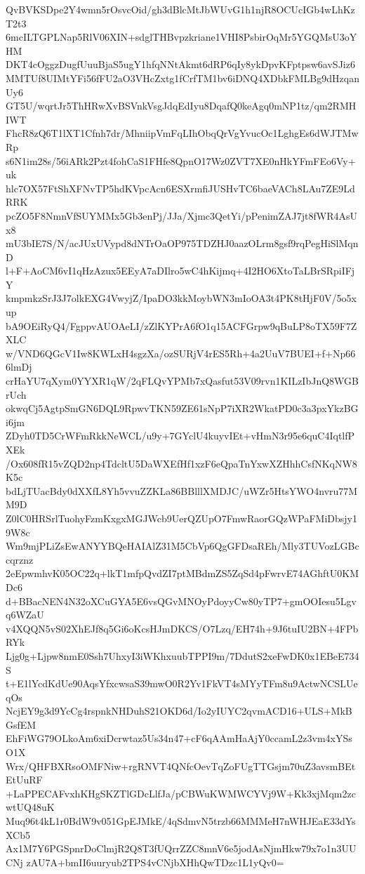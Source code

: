 QvBVKSDpe2Y4wmn5rOsvcOid/gh3dBlcMtJbWUvG1h1njR8OCUcIGb4wLhKzT2t3
6mcILTGPLNap5RlV06XIN+sdglTHBvpzkriane1VHI8PsbirOqMr5YGQMsU3oYHM
DKT4cOggzDugfUuuBjaS5ugY1hfqNNtAkmt6dRP6qIy8ykDpvKFptpsw6avSJiz6
MMTUf8UIMtYFi56fFU2aO3VHcZxtg1fCrfTM1bv6iDNQ4XDbkFMLBg9dHzqanUy6
GT5U/wqrtJr5ThHRwXvBSVnkVsgJdqEdIyu8DqafQ0keAgq0mNP1tz/qm2RMHIWT
FhcR8zQ6T1lXT1Cfnh7dr/MhniipVmFqLIhObqQrVgYvucOc1LghgEs6dWJTMwRp
s6N1im28s/56iARk2Pzt4fohCaS1FHfe8QpnO17Wz0ZVT7XE0nHkYFmFEo6Vy+uk
hlc7OX57FtShXFNvTP5hdKVpcAcn6ESXrmfiJUSHvTC6baeVACh8LAu7ZE9LdRRK
pcZO5F8NmnVfSUYMMx5Gb3enPj/JJa/Xjmc3QetYi/pPenimZAJ7jt8fWR4AsUx8
mU3bIE7S/N/acJUxUVypd8dNTrOaOP975TDZHJ0aazOLrm8gsf9rqPegHiSlMqnD
l+F+AoCM6vI1qHzAzux5EEyA7aDIlro5wC4hKijmq+4I2HO6XtoTaLBrSRpiIFjY
kmpmkzSrJ3J7olkEXG4VwyjZ/IpaDO3kkMoybWN3mIoOA3t4PK8tHjF0V/5o5xup
bA9OEiRyQ4/FgppvAUOAeLI/zZlKYPrA6fO1q15ACFGrpw9qBuLP8oTX59F7ZXLC
w/VND6QGcV1Iw8KWLxH4sgzXa/ozSURjV4rES5Rh+4a2UuV7BUEI+f+Np666lmDj
crHaYU7qXym0YYXR1qW/2qFLQvYPMb7xQasfut53V09rvn1KILzIbJnQ8WGBrUch
okwqCj5AgtpSmGN6DQL9RpwvTKN59ZE61sNpP7iXR2WkatPD0c3a3pxYkzBGi6jm
ZDyh0TD5CrWFmRkkNeWCL/u9y+7GYclU4kuyvIEt+vHmN3r95e6quC4IqtlfPXEk
/Ox608fR15vZQD2np4TdcltU5DaWXEfHf1xzF6eQpaTnYxwXZHhhCsfNKqNW8K5c
bdLjTUacBdy0dXXfL8Yh5vvuZZKLa86BBlllXMDJC/uWZr5HtsYWO4nvru77MM9D
Z0lC0HRSrlTuohyFzmKxgxMGJWcb9UerQZUpO7FmwRaorGQzWPaFMiDbsjy19W8c
Wm9mjPLiZsEwANYYBQeHAIAlZ31M5CbVp6QgGFDsaREh/Mly3TUVozLGBccqrznz
2eEpwmhvK05OC22q+lkT1mfpQvdZI7ptMBdmZS5ZqSd4pFwrvE74AGhftU0KMDc6
d+BBacNEN4N32oXCuGYA5E6vsQGvMNOyPdoyyCw80yTP7+gmOOIesu5Lgvq6WZaU
v4XQQN5vS02XhEJf8q5Gi6oKcsHJmDKCS/O7Lzq/EH74h+9J6tuIU2BN+4FPbRYk
Ljg0g+Ljpw8nmE0Ssh7UhxyI3iWKhxuubTPPI9m/7DdutS2xeFwDK0x1EBeE734S
t+E1lYcdKdUe90AqsYfxcwsaS39mwO0R2Yv1FkVT4sMYyTFm8u9ActwNCSLUeqOs
NcjEY9g3d9YcCg4rspnkNHDuhS21OKD6d/Io2yIUYC2qvmACD16+ULS+MkBGsfEM
EhFiWG79OLkoAm6xiDcrwtaz5Us34n47+cF6qAAmHaAjY0ccamL2z3vm4xYSsO1X
Wrx/QHFBXRsoOMFNiw+rgRNVT4QNfcOevTqZoFUgTTGsjm70uZ3avsmBEtEtUuRF
+LaPPECAFvxhKHgSKZTlGDcLlfJa/pCBWuKWMWCYVj9W+Kk3xjMqm2zcwtUQ48uK
Muq96t4kL1r0BdW9v051GpEJMkE/4qSdmvN5trzb66MMMeH7nWHJEaE33dYsXCb5
Ax1M7Y6PGSpnrDoClmjR2Q8T3fUQrrZZC8mnV6e5jodAsNjmHkw79x7o1n3UUCNj
zAU7A+bmII6uuryub2TPS4vCNjbXHhQwTDzc1L1yQv0=
